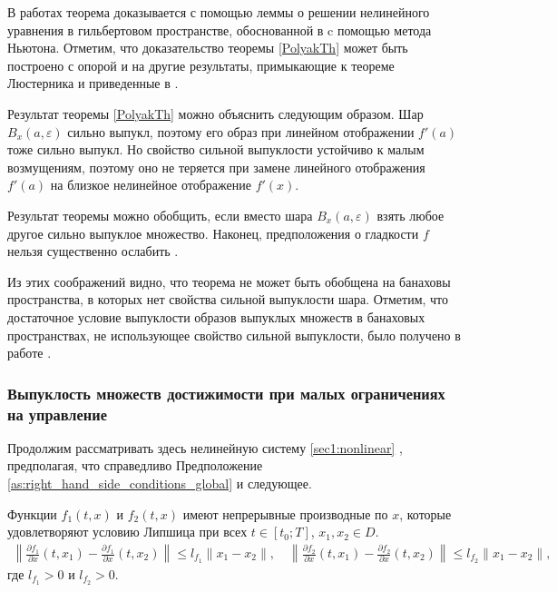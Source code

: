 \documentclass[../main.tex]{subfiles}
\begin{document}
	В работах \cite{Polyak2001, Polyak2001ru} теорема доказывается с помощью леммы о решении нелинейного уравнения в гильбертовом пространстве, обоснованной в \cite{Polyak1964} c помощью метода Ньютона. Отметим, что доказательство теоремы \ref{PolyakTh} может быть построено с опорой и на другие результаты, примыкающие к теореме Люстерника и приведенные в \cite{Dmitruk1980, Ioffe}.
	
	Результат теоремы \ref{PolyakTh} можно объяснить следующим образом. Шар $B_x(a,\varepsilon)$ сильно выпукл, поэтому его образ при линейном отображении $f'(a)$ тоже сильно выпукл. Но свойство сильной выпуклости устойчиво к малым возмущениям, поэтому оно не теряется при замене линейного отображения $f'(a)$ на близкое нелинейное отображение $f'(x)$. 
	
	Результат теоремы можно обобщить, если вместо шара $B_x(a,\varepsilon) $ взять любое другое сильно выпуклое множество. Наконец, предположения о гладкости $f$ нельзя существенно ослабить \cite{Polyak2001, Polyak2001ru}.
	
	Из этих соображений видно, что теорема не может быть обобщена на банаховы пространства, в которых нет свойства сильной выпуклости шара. Отметим, что достаточное условие выпуклости  образов выпуклых множеств в банаховых пространствах, не использующее свойство сильной выпуклости, было получено в работе \cite{Ledyaev}. 
	
	\subsubsection{Выпуклость множеств достижимости при малых ограничениях на управление}
	
	Продолжим рассматривать здесь нелинейную систему \eqref{sec1:nonlinear} , предполагая, что справедливо Предположение \ref{as:right_hand_side_conditions_global} и следующее.
	 \begin{assumption}\label{as:right_hand_side_diff_lip}
		Функции $f_1(t,x)$ и $f_2(t,x)$ имеют непрерывные производные по $x$, которые удовлетворяют условию Липшица при всех $t \in [t_0;T]$, $x_1, x_2 \in D$.
		\begin{gather*}
			\left\| \frac{\partial f_1}{\partial x}(t,x_1) - \frac{\partial f_1}{\partial x}(t,x_2) \right\| \leqslant l_{f_1} \| x_1 - x_2\|, \quad 	\left\| \frac{\partial f_2}{\partial x}(t,x_1) - \frac{\partial f_2}{\partial x}(t,x_2) \right\| \leqslant l_{f_2} \| x_1 - x_2\|,
		\end{gather*}
		где $l_{f_1} > 0$ и $l_{f_2} > 0$.
	\end{assumption}
	
\end{document}
